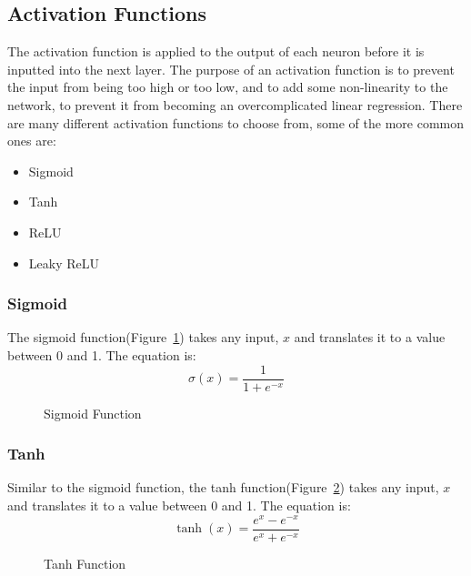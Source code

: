 \documentclass[titlepage]{article}
\begin{document}
\subsection{Activation Functions}
The activation function is applied to the output of each neuron before it is inputted into the next layer. The purpose of an activation function is to prevent the input from being too high or too low, and to add some non-linearity to the network, to prevent it from becoming an overcomplicated linear regression. There are many different activation functions to choose from, some of the more common ones are:
\begin{itemize}
    \item Sigmoid
    \item Tanh
    \item ReLU
    \item Leaky ReLU
\end{itemize}
\subsubsection{Sigmoid}
The sigmoid function(Figure~\ref{fig:sigmoid_function}) takes any input, $x$ and translates it to a value between 0 and 1. The equation is:
\begin{equation}
    \sigma(x) = \frac{1}{1 + e^{-x}}
    \label{eq:sigmoid}
\end{equation}
\begin{figure}[h!]
    \begin{center}
    \end{center}
    \caption{Sigmoid Function}    
    \label{fig:sigmoid_function}
\end{figure}


\subsubsection{Tanh}
Similar to the sigmoid function, the tanh function(Figure~\ref{fig:tanh}) takes any input, $x$ and translates it to a value between 0 and 1. The equation is:
\begin{equation}
    \tanh(x) = \frac{e^{x} - e^{-x}}{e^{x} + e^{-x}}
    \label{eq:tanh}
\end{equation}
\begin{figure}[h!]
    \begin{center}
    \end{center}
    \label{fig:tanh}
    \caption{Tanh Function}    
\end{figure}
\end{document}
